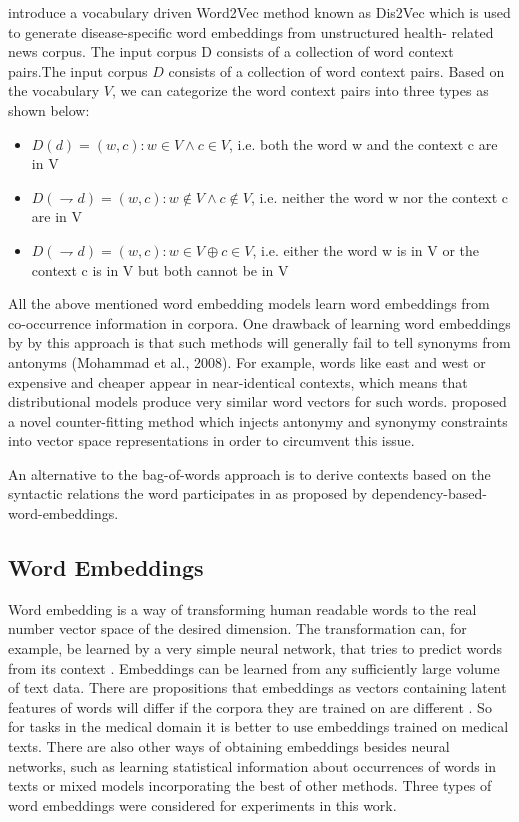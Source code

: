 \cite{ghosh2016characterizing} introduce a vocabulary driven Word2Vec method known as Dis2Vec which is
used to generate disease-specific word embeddings from unstructured health-
related news corpus. The input corpus D consists of a collection of word context pairs.The input corpus $D$ consists of a collection of word context pairs. Based on the vocabulary $ V$, we can categorize the word context pairs into three types as shown
below:
\\
\begin{itemize}
	\item $ D(d) = {(w, c): w \in V ∧c \in V }$, i.e. both the word w and the context c are in V
	\item $D(\rightharpoondown d) = {(w, c): w \notin V ∧c \notin V }$, i.e. neither the word w nor the context c are in V
	\item $D(\rightharpoondown d) = {(w, c): w \in V \oplus c \in V }$, i.e. either the word w is in V or the context c is in V but both cannot be in V
\end{itemize}

All the above mentioned word embedding models learn word embeddings from co-occurrence information in corpora.
One drawback of learning word embeddings by by this approach is that such methods will generally fail to tell synonyms from
antonyms (Mohammad et al., 2008). For example, words like east and west
or expensive and cheaper appear in near-identical contexts, which means
that distributional models produce very similar word vectors for such words.
\cite{mrksic:2016:naacl} proposed a novel counter-fitting method which injects antonymy and
synonymy constraints into vector space representations in order to circumvent this issue.

An alternative to
the bag-of-words approach is to derive contexts
based on the syntactic relations the word participates
in as proposed by {dependency-based-word-embeddings}. 


\subsection{Word Embeddings} 
Word embedding is a way of transforming human readable words to the real number vector 
space of the desired dimension. The transformation can, for example, be learned by a very simple neural network, that tries to predict words from its context \cite{NIPS2013_5021}. Embeddings 
can be learned from any sufficiently large volume of text data. There are propositions that embeddings  
as vectors containing latent features of words will differ if the corpora they are trained on are different \cite{bollegala2015unsupervised}. So for 
tasks in the medical domain it is better to use embeddings trained on medical texts. There are also other ways of obtaining embeddings besides neural networks, such 
as learning statistical information about occurrences of words in texts or mixed models incorporating the best of other methods. Three types of word embeddings were considered 
for experiments in this work.

